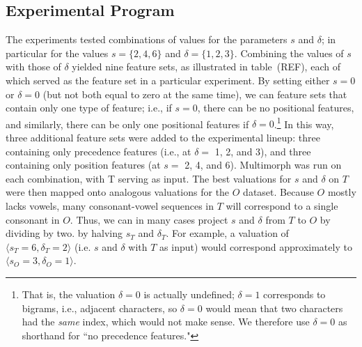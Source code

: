 \subsection{Experimental Program}
The experiments tested combinations of values for the parameters $s$ and $\delta$; 
in particular for the values $s = \{2,4,6\}$ and $\delta = \{1,2,3\}$. Combining the
values of $s$ with those of $\delta$ yielded nine feature sets, as illustrated in table~(REF),
each of which served as the feature set in a particular experiment. By setting either $s = 0$ or $\delta=0$
(but not both equal to zero at the same time), we can feature sets that contain only one type of feature;
i.e., if $s=0$, there can be no positional features, and similarly, there can be only one positional features 
if $\delta=0$.\footnote{That is, the valuation $\delta = 0$ is actually
undefined; $\delta = 1$ corresponds to bigrams, i.e., adjacent characters, so $\delta = 0$ would 
mean that two characters had the \emph{same} index, which would not make sense. 
We therefore use $\delta = 0$ as shorthand for ``no precedence features."} In this way,
three additional feature sets were added to the experimental lineup: three containing only 
precedence features (i.e., at $\delta =$ 1, 2, and 3), and
three containing only position features (at $s =$ 2, 4, and 6).
Multimorph was run on each combination, with T serving as input.  The best valuations for $s$ 
and $\delta$ on $T$
were then mapped onto analogous valuations for the $O$ dataset. Because $O$ mostly lacks 
vowels, many consonant-vowel sequences in $T$ will correspond to a single consonant in $O$. Thus, 
we can in many cases
project $s$ and $\delta$ from $T$ to $O$ by dividing by two. 
by halving $s_{T}$ and $\delta_{T}$.
For example, a valuation of 
$\langle s_T = 6, \delta_T = 2 \rangle$ (i.e. $s$ and $\delta$ with $T$ as input)  would correspond 
approximately to $\langle s_O = 3, \delta_O = 1 \rangle$.
 


